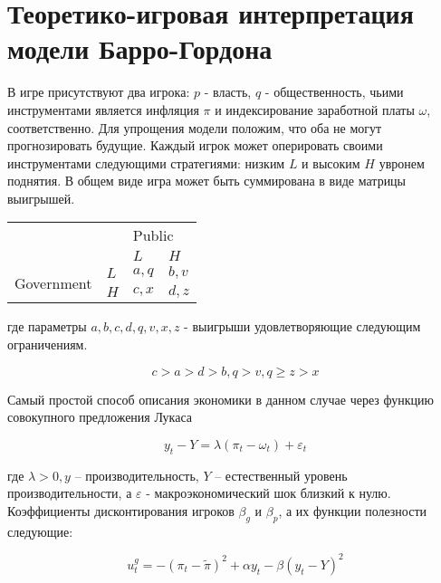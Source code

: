 
\section{Теоретико-игровая интерпретация модели Барро-Гордона}

В игре присутствуют два игрока: $p$ - власть, $q$ - общественность, чьими инструментами является инфляция $\pi$  и индексирование заработной платы $\omega$, соответственно. Для упрощения модели положим, что оба не могут прогнозировать будущие. Каждый игрок может оперировать своими инструментами следующими стратегиями: низким $L$  и высоким  $H$ увронем поднятия. В общем виде игра может быть суммирована в виде матрицы выигрышей. 
\begin{table}[h]
	\centering
\begin{tabular}{|l|l|l|l|}
	\hline
	\multicolumn{2}{|l|}{\multirow{2}{*}{}} & \multicolumn{2}{l|}{Public} \\ \cline{3-4} 
	\multicolumn{2}{|l|}{}                  & $L$            & $H$            \\ \hline
	\multirow{2}{*}{Government}     & $L$     & $a,q$          & $b,v$          \\ \cline{2-4} 
	& $H$     & $c,x$          & $d,z$          \\ \hline
\end{tabular}
\end{table}

где параметры $a,b,c,d,q,v,x,z$  - выигрыши удовлетворяющие следующим ограничениям.

\begin{equation}
c>a>d>b, q>v, q\ge z>x
\label{eq:sec:ot:restrictions}
\end{equation}

Самый простой способ описания экономики в данном случае через функцию совокупного предложения Лукаса

\begin{equation}
\label{eq:sec:ot:lucas}
y_t - Y = \lambda(\pi_t - \omega_t)+\varepsilon_t
\end{equation}

где  $\lambda>0, y$  – производительность, $Y$ – естественный уровень производительности, а  $\varepsilon$ - макроэкономический шок близкий к нулю. Коэффициенты дисконтирования игроков $\beta_g$ и $\beta_p$, а их функции  полезности  следующие: 

\begin{equation}
\label{eq:sec:ot:govUtil}
u^g_t=-(\pi_t - \tilde{\pi})^2 + \alpha y_t - \beta(y_t-Y)^2
\end{equation}

